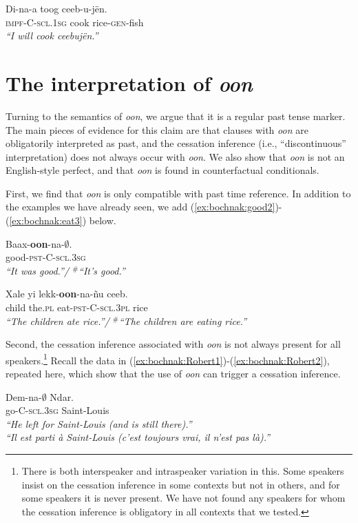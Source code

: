 \documentclass[output=paper,newtxmath,modfonts,nonflat,draftmode]{langsci/langscibook}
\begin{document}
\ea
\gll Di-na-a toog ceeb-u-j\"en.\\
\textsc{impf}-C-\textsc{scl.1sg}  cook rice-\textsc{gen}-fish\\
\glt \textit{``I will cook ceebuj\"en.''}\label{ex:bochnak:future1}
\z


\section{The interpretation of \textit{oon}}

Turning to the semantics of \textit{oon}, we argue that it is a
regular past tense marker. The main pieces of evidence for this claim are that clauses with \textit{oon} are obligatorily interpreted as
past, and the cessation inference (i.e., ``discontinuous'' interpretation) does not always occur with \textit{oon}. We also show that
\textit{oon} is not an English-style perfect, and that \textit{oon} is
found in counterfactual conditionals.

First, we find that \textit{oon} is only compatible with past time reference. In addition to the examples we have already seen, we add (\ref{ex:bochnak:good2})-(\ref{ex:bochnak:eat3}) below.

\ea
\gll Baax-\textbf{oon}-na-$\emptyset$.\\
good-\textsc{pst}-C-\textsc{scl.3sg}\\
\glt \textit{``It was good.''/ $^{\#}$``It's good.''}\label{ex:bochnak:good2}
\z

\ea
\gll Xale yi lekk-\textbf{oon}-na-\~nu ceeb.\\
child the.\textsc{pl} eat-\textsc{pst}-C-\textsc{scl.3pl} rice\\
\glt \textit{``The children ate rice.''/ $^{\#}$``The children are eating
  rice.''}\label{ex:bochnak:eat3}
\z

Second, the cessation inference associated with \textit{oon} is not
always present for all speakers.\footnote{There is both interspeaker
  and intraspeaker variation in this. Some speakers insist on the
  cessation inference in some contexts but not in others, and for some
  speakers it is never present. We have not found any speakers for
  whom the cessation inference is obligatory in all contexts that we tested.} Recall the data in (\ref{ex:bochnak:Robert1})-(\ref{ex:bochnak:Robert2}), repeated here, which show that the use of \textit{oon} can
trigger a cessation inference.

\ea
\gll\label{leave1-rep}Dem-na-$\emptyset$ Ndar.\\
go-C-\textsc{scl.3sg} Saint-Louis\\
\glt \textit{``He left for Saint-Louis (and is still there).''}\\\textit{``Il est parti \`a Saint-Louis (c'est toujours vrai, il n'est
  pas l\`a).''} \hfill \citep[p.~279]{robert91approche}
\z
\end{document}

